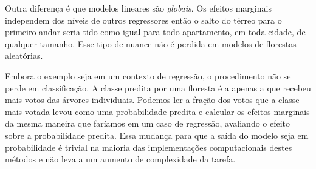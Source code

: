 Outra diferença é que modelos lineares são \textit{globais}. Os efeitos marginais independem dos níveis de outros regressores então o salto do térreo para o primeiro andar seria tido como igual para todo apartamento, em toda cidade, de qualquer tamanho. Esse tipo de nuance não é perdida em modelos de florestas aleatórias. 

Embora o exemplo seja em um contexto de regressão, o procedimento não se perde em classificação. A classe predita por uma floresta é a apenas a que recebeu mais votos das árvores individuais. Podemos ler a fração dos votos que a classe mais votada levou como uma probabilidade predita e calcular os efeitos marginais da mesma maneira que faríamos em um caso de regressão, avaliando o efeito sobre a probabilidade predita. Essa mudança para que a saída do modelo seja em probabilidade é trivial na maioria das implementações computacionais destes métodos e não leva a um aumento de complexidade da tarefa.










